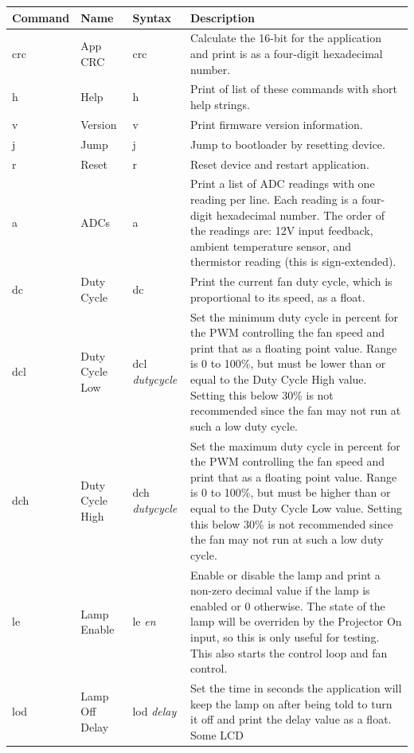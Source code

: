 \documentclass{article}
\begin{document}
\begin{longtable}{l|l|p{}|p{}}
    \centering
    Command & Name & Syntax & Description \\
    \hline
    \endhead
    crc & App CRC & crc & Calculate the 16-bit for the application and print is as a four-digit
    hexadecimal number. \\
    h & Help & h & Print of list of these commands with short help strings. \\
    v & Version & v & Print firmware version information. \\
    j & Jump & j & Jump to bootloader by resetting device. \\
    r & Reset & r & Reset device and restart application. \\
    a & ADCs & a & Print a list of ADC readings with one reading per line.  Each reading is a
    four-digit hexadecimal number.  The order of the readings are:  12V input feedback, ambient
    temperature sensor, and thermistor reading (this is sign-extended). \\
    dc & Duty Cycle & dc & Print the current fan duty cycle, which is proportional to its speed, as
    a float. \\
    dcl & Duty Cycle Low & dcl \emph{dutycycle} & Set the minimum duty cycle in percent for the PWM
    controlling the fan speed and print that as a floating point value.  Range is 0 to 100\%, but
    must be lower than or equal to the Duty Cycle High value.  Setting this below 30\% is not
    recommended since the fan may not run at such a low duty cycle. \\
    dch & Duty Cycle High & dch \emph{dutycycle} & Set the maximum duty cycle in percent for the PWM
    controlling the fan speed and print that as a floating point value.  Range is 0 to 100\%, but
    must be higher than or equal to the Duty Cycle Low value.  Setting this below 30\% is not
    recommended since the fan may not run at such a low duty cycle. \\
    le & Lamp Enable & le \emph{en} & Enable or disable the lamp and print a non-zero decimal value
    if the lamp is enabled or 0 otherwise.  The state of the lamp will be overriden by the Projector
    On input, so this is only useful for testing.  This also starts the control loop and
    fan control. \\
    lod & Lamp Off Delay & lod \emph{delay} & Set the time in seconds the application will keep the
    lamp on after being told to turn it off and print the delay value as a float.  Some LCD

\end{longtable}
\end{document}
